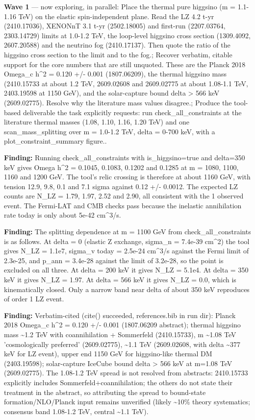 \documentclass[11pt,a4paper]{article}
\begin{document}
\textbf{Wave 1} --- now exploring, in parallel: Place the thermal pure higgsino (m = 1.1-1.16 TeV) on the elastic spin-independent plane. Read the LZ 4.2 t-yr (2410.17036), XENONnT 3.1 t-yr (2502.18005) and first-run (2207.03764, 2303.14729) limits at 1.0-1.2 TeV, the loop-level higgsino cross section (1309.4092, 2607.20588) and the neutrino fog (2410.17137). Then quote the ratio of the higgsino cross section to the limit and to the fog.; Recover verbatim, citable support for the core numbers that are still unquoted. These are the Planck 2018 Omega\_c h\textasciicircum{}2 = 0.120 +/- 0.001 (1807.06209), the thermal higgsino mass (2410.15733 at about 1.2 TeV, 2609.02608 and 2609.02775 at about 1.08-1.1 TeV, 2403.19598 at 1150 GeV), and the solar-capture bound delta \textgreater{} 566 keV (2609.02775). Resolve why the literature mass values disagree.; Produce the tool-based deliverable the task explicitly requests: run check\_all\_constraints at the literature thermal masses (1.08, 1.10, 1.16, 1.20 TeV) and one scan\_mass\_splitting over m = 1.0-1.2 TeV, delta = 0-700 keV, with a plot\_constraint\_summary figure..

\textbf{Finding:} Running check\_all\_constraints with is\_higgsino=true and delta=350 keV gives Omega h\textasciicircum{}2 = 0.1045, 0.1083, 0.1202 and 0.1285 at m = 1080, 1100, 1160 and 1200 GeV. The tool's relic crossing is therefore at about 1160 GeV, with tension 12.9, 9.8, 0.1 and 7.1 sigma against 0.12 +/- 0.0012. The expected LZ counts are N\_LZ = 1.79, 1.97, 2.52 and 2.90, all consistent with the 1 observed event. The Fermi-LAT and CMB checks pass because the inelastic annihilation rate today is only about 5e-42 cm\textasciicircum{}3/s.

\textbf{Finding:} The splitting dependence at m = 1100 GeV from check\_all\_constraints is as follows. At delta = 0 (elastic Z exchange, sigma\_n = 7.4e-39 cm\textasciicircum{}2) the tool gives N\_LZ = 1.1e7, sigma\_v today = 2.5e-24 cm\textasciicircum{}3/s against the Fermi limit of 2.3e-25, and p\_ann = 3.4e-28 against the limit of 3.2e-28, so the point is excluded on all three. At delta = 200 keV it gives N\_LZ = 5.1e4. At delta = 350 keV it gives N\_LZ = 1.97. At delta = 566 keV it gives N\_LZ = 0.0, which is kinematically closed. Only a narrow band near delta of about 350 keV reproduces of order 1 LZ event.

\textbf{Finding:} Verbatim-cited (cite() succeeded, references.bib in run dir): Planck 2018 Omega\_c h\textasciicircum{}2 = 0.120 +/- 0.001 (1807.06209 abstract); thermal higgsino mass \textasciitilde{}1.2 TeV with coannihilation + Sommerfeld (2410.15733), m \textasciitilde{}1.08 TeV 'cosmologically preferred' (2609.02775), \textasciitilde{}1.1 TeV (2609.02608, with delta \textasciitilde{}377 keV for LZ event), upper end 1150 GeV for higgsino-like thermal DM (2403.19598); solar-capture IceCube bound delta \textgreater{} 566 keV at m=1.08 TeV (2609.02775). The 1.08-1.2 TeV spread is not resolved from abstracts: 2410.15733 explicitly includes Sommerfeld+coannihilation; the others do not state their treatment in the abstract, so attributing the spread to bound-state formation/NLO/Planck input remains unverified (likely \textasciitilde{}10\% theory systematics; consensus band 1.08-1.2 TeV, central \textasciitilde{}1.1 TeV).
\end{document}
